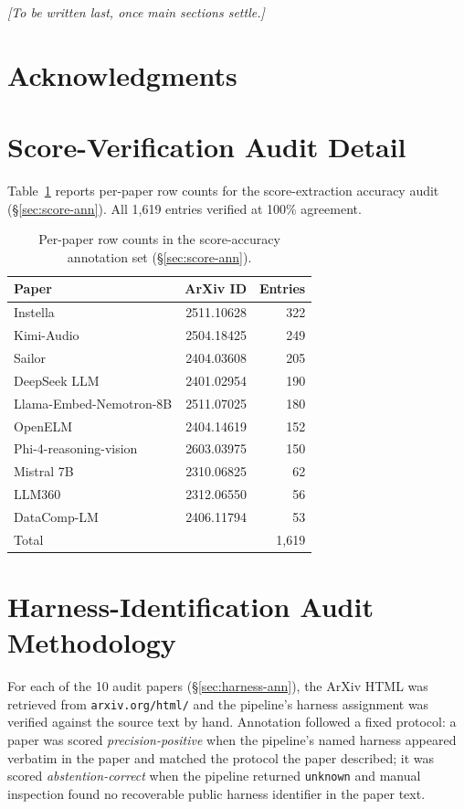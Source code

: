 \documentclass[11pt]{article}
\begin{document}
\textit{[To be written last, once main sections settle.]}
\section*{Acknowledgments}


\appendix

\section{Score-Verification Audit Detail}
\label{app:audit}

Table~\ref{tab:score-ann-app} reports per-paper row counts for the
score-extraction accuracy audit (\S\ref{sec:score-ann}). All 1{,}619
entries verified at 100\% agreement.

\begin{table}[ht]
\centering
\small
\begin{tabular}{lrr}
\toprule
Paper & ArXiv ID & Entries \\
\midrule
Instella                 & 2511.10628 & 322 \\
Kimi-Audio               & 2504.18425 & 249 \\
Sailor                   & 2404.03608 & 205 \\
DeepSeek LLM             & 2401.02954 & 190 \\
Llama-Embed-Nemotron-8B  & 2511.07025 & 180 \\
OpenELM                  & 2404.14619 & 152 \\
Phi-4-reasoning-vision   & 2603.03975 & 150 \\
Mistral 7B               & 2310.06825 &  62 \\
LLM360                   & 2312.06550 &  56 \\
DataComp-LM              & 2406.11794 &  53 \\
\midrule
Total                    &            & 1{,}619 \\
\bottomrule
\end{tabular}
\caption{Per-paper row counts in the score-accuracy annotation set
(\S\ref{sec:score-ann}).}
\label{tab:score-ann-app}
\end{table}


\section{Harness-Identification Audit Methodology}
\label{app:harness}

For each of the 10 audit papers (\S\ref{sec:harness-ann}), the ArXiv HTML
was retrieved from \texttt{arxiv.org/html/} and the pipeline's harness
assignment was verified against the source text by hand. Annotation
followed a fixed protocol: a paper was scored \emph{precision-positive}
when the pipeline's named harness appeared verbatim in the paper and
matched the protocol the paper described; it was scored
\emph{abstention-correct} when the pipeline returned \texttt{unknown} and
manual inspection found no recoverable public harness identifier in the
paper text.
\end{document}
